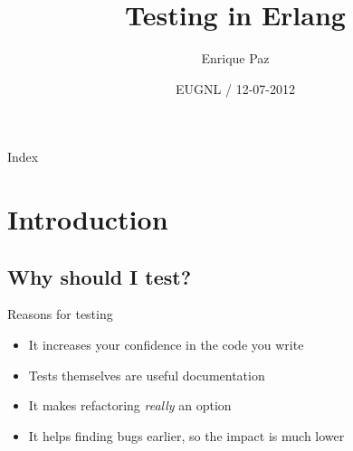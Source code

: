 \documentclass[]{beamer}
\title[]{Testing in Erlang}
\author[] %
{Enrique Paz}
\institute[] %
{Senior Backend Developer @ Team Services}
\date[] %
{EUGNL / 12-07-2012}
\begin{document}
\begin{frame}
  \titlepage
\end{frame}

\begin{frame}{Index}
  \tableofcontents
\end{frame}

\section{Introduction}

\subsection*{Why should I test?}
\label{why_should_i_test}

\begin{frame}{Reasons for testing}
    \begin{itemize}
    \item It increases your confidence in the code you write
    \pause
    \item Tests themselves are useful documentation
    \pause
    \item It makes refactoring \emph{really} an option
    \pause
    \item It helps finding bugs earlier, so the impact is much lower
    \end{itemize}
\end{frame}
\end{document}
